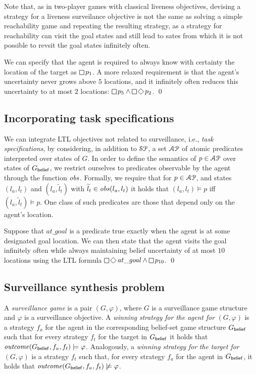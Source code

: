 Note that, as in two-player games with classical liveness objectives, devising a strategy for a liveness surveilance objective is not the same as solving a simple reachability game and repeating the resulting strategy, as a strategy for reachability can visit the goal states and still lead to sates from which it is not possible to revsit the goal states infinitely often. 

\bigskip
\begin{eg}
We can specify that the agent is required to always know with certainty the location of the target as
$\LTLglobally p_1$.
A more relaxed requirement is that the agent's uncertainty never grows above $5$ locations, and it infinitely often reduces this uncertainty to at most $2$ locations: $\LTLglobally p_5 \wedge \LTLglobally\LTLfinally p_2$.
\qed
\end{eg}


\subsection{Incorporating task specifications}
We can integrate LTL objectives not related to surveillance, i.e., \emph{task specifications}, by considering, in addition to $\mathcal{SP}$, a set $\mathcal{AP}$ of atomic predicates interpreted over states of $G$. In order to define the semantics of $p \in \mathcal{AP}$ over states of $G_{\mathsf{belief}}$, we restrict ourselves to predicates observable by the agent through the function $\mathit{obs}$. 
Formally, we require that for $p \in \mathcal{AP}$, and states $(l_a,l_t)$ and $(l_a,\widetilde l_t)$ with $\widetilde l_t \in \mathit{obs}(l_a,l_t)$ it holds that $(l_a,l_t) \models p$ iff $(l_a,\widetilde l_t) \models p$. One class of such predicates are those that depend only on the agent's location.

\bigskip
\begin{eg}
Suppose that $\mathit{at\_goal}$ is a predicate true exactly when the agent is at some designated goal location. We can then state that the agent visits the goal infinitely often while always maintaining belief uncertainty of at most $10$ locations using the LTL formula $\LTLglobally\LTLfinally \mathit{at\_goal} \wedge \LTLglobally p_{10}$.
\qed
\end{eg}

\subsection{Surveillance synthesis problem}
A \emph{surveillance game} is a pair $(G,\varphi)$, where $G$ is a surveillance game structure and $\varphi$ is a surveillance objective. A \emph{winning strategy for the agent for $(G,\varphi)$} is a strategy $f_a$ for the agent in the corresponding belief-set game structure $G_{\mathsf{belief}}$ such that for every strategy $f_t$ for the target in $G_{\mathsf{belief}}$ it holds that $\mathit{outcome}(G_{\mathsf{belief}},f_a,f_t) \models \varphi$. Analogously, a \emph{winning strategy for the target for $(G,\varphi)$} is a strategy $f_t$ such that, for every strategy $f_a$ for the agent in $G_{\mathsf{belief}}$, it holds that $\mathit{outcome}(G_{\mathsf{belief}},f_a,f_t) \not\models \varphi$.


